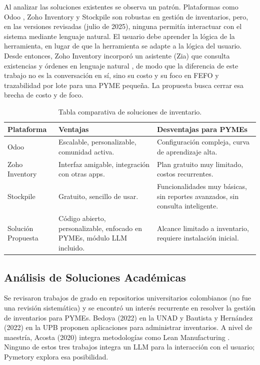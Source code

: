 Al analizar las soluciones existentes se observa un patrón. Plataformas como Odoo \cite{odoo}, Zoho Inventory \cite{zoho} y Stockpile \cite{stockpile} son robustas en gestión de inventarios, pero, en las versiones revisadas (julio de 2025), ninguna permitía interactuar con el sistema mediante lenguaje natural. El usuario debe aprender la lógica de la herramienta, en lugar de que la herramienta se adapte a la lógica del usuario. Desde entonces, Zoho Inventory incorporó un asistente (Zia) que consulta existencias y órdenes en lenguaje natural \cite{zoho_zia_inventario}, de modo que la diferencia de este trabajo no es la conversación en sí, sino su costo y su foco en FEFO y trazabilidad por lote para una PYME pequeña. La propuesta busca cerrar esa brecha de costo y de foco.

\begin{table}[!htbp]
\centering
\caption{Tabla comparativa de soluciones de inventario.}
\label{tab:comparativa_soluciones}
\begin{tabular}{|l|p{}|p{}|}
\hline
\textbf{Plataforma} & \textbf{Ventajas} & \textbf{Desventajas para PYMEs} \\
\hline
Odoo \cite{odoo} & Escalable, personalizable, comunidad activa. & Configuración compleja, curva de aprendizaje alta. \\
\hline
Zoho Inventory \cite{zoho} & Interfaz amigable, integración con otras apps. & Plan gratuito muy limitado, costos recurrentes. \\
\hline
Stockpile \cite{stockpile} & Gratuito, sencillo de usar. & Funcionalidades muy básicas, sin reportes avanzados, sin consulta inteligente. \\
\hline
Solución Propuesta & Código abierto, personalizable, enfocado en PYMEs, módulo LLM incluido. & Alcance limitado a inventario, requiere instalación inicial. \\
\hline
\end{tabular}
\end{table}

\subsection{Análisis de Soluciones Académicas}

Se revisaron trabajos de grado en repositorios universitarios colombianos (no fue una revisión sistemática) y se encontró un interés recurrente en resolver la gestión de inventarios para PYMEs. Bedoya (2022) en la UNAD \cite{unad_bedoya2022} y Bautista y Hernández (2022) en la UPB \cite{upb_bautista2022} proponen aplicaciones para administrar inventarios. A nivel de maestría, Acosta (2020) integra metodologías como Lean Manufacturing \cite{uamerica_acosta2020}. Ninguno de estos tres trabajos integra un LLM para la interacción con el usuario; Pymetory explora esa posibilidad.

